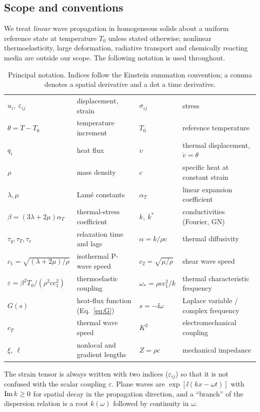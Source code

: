 \subsection{Scope and conventions}\label{sec:conventions}
We treat \emph{linear} wave propagation in homogeneous solids about a uniform reference state at temperature $T_0$ unless stated otherwise; nonlinear thermoelasticity, large deformation, radiative transport and chemically reacting media are outside our scope. The following notation is used throughout.

\begin{table}[ht]\centering\small
\caption{Principal notation. Indices follow the Einstein summation convention; a comma denotes a spatial derivative and a dot a time derivative.}\label{tab:notation}
\begin{tabular}{@{}lp{4.1cm}lp{4.3cm}@{}}\toprule
$u_i,\ \varepsilon_{ij}$ & displacement, strain & $\sigma_{ij}$ & stress\\
$\theta=T-T_0$ & temperature increment & $T_0$ & reference temperature\\
$q_i$ & heat flux & $v$ & thermal displacement, $\dot v=\theta$\\
$\rho$ & mass density & $c$ & specific heat at constant strain\\
$\lambda,\mu$ & Lam\'e constants & $\alpha_T$ & linear expansion coefficient\\
$\beta=(3\lambda+2\mu)\alpha_T$ & thermal-stress coefficient & $k,\ k^*$ & conductivities (Fourier, GN)\\
$\tau_q,\tau_T,\tau_v$ & relaxation time and lags & $\alpha=k/\rho c$ & thermal diffusivity\\
$c_1=\sqrt{(\lambda+2\mu)/\rho}$ & isothermal P-wave speed & $c_2=\sqrt{\mu/\rho}$ & shear wave speed\\
$\varepsilon=\beta^2T_0/(\rho^2cc_1^2)$ & thermoelastic coupling & $\omega_*=\rho c c_1^2/k$ & thermal characteristic frequency\\
$G(s)$ & heat-flux function (Eq.~\eqref{eq:G}) & $s=-\ii\omega$ & Laplace variable / complex frequency\\
$c_T$ & thermal wave speed & $K^2$ & electromechanical coupling\\
$\xi,\ \ell$ & nonlocal and gradient lengths & $Z=\rho c$ & mechanical impedance\\
\bottomrule\end{tabular}
\end{table}
The strain tensor is always written with two indices ($\varepsilon_{ij}$) so that it is not confused with the scalar coupling $\varepsilon$. Plane waves are $\exp[\ii(kx-\omega t)]$ with $\operatorname{Im} k\ge0$ for spatial decay in the propagation direction, and a ``branch'' of the dispersion relation is a root $k(\omega)$ followed by continuity in $\omega$.

